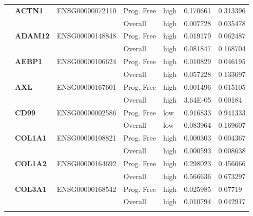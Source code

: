\begin{spacing}{1}
{\begin{longtable}{|>{\bfseries}p{2cm}|>{\bfseries}p{1.9cm}|p{2.8cm}|p{2cm}|p{2cm}|p{1.5cm}|p{1.5cm}|}
            \multirow{2}{3cm}{True}
             & ACTN1    & ENSG00000072110 & Prog. Free & high & 0.170661 & 0.313396 \\
            \hhline{~~~----}
             &          &                 & Overall    & high & 0.007728 & 0.035478 \\
            \hhline{~======}
             & ADAM12   & ENSG00000148848 & Prog. Free & high & 0.019179 & 0.062487 \\
            \hhline{~~~----}
             &          &                 & Overall    & high & 0.081847 & 0.168704 \\
            \hhline{~======}
             & AEBP1    & ENSG00000106624 & Prog. Free & high & 0.010829 & 0.046195 \\
            \hhline{~~~----}
             &          &                 & Overall    & high & 0.057228 & 0.133697 \\
            \hhline{~======}
             & AXL      & ENSG00000167601 & Prog. Free & high & 0.001496 & 0.015105 \\
            \hhline{~~~----}
             &          &                 & Overall    & high & 3.64E-05 & 0.00184  \\
            \hhline{~======}
             & CD99     & ENSG00000002586 & Prog. Free & low  & 0.916833 & 0.941333 \\
            \hhline{~~~----}
             &          &                 & Overall    & low  & 0.083964 & 0.169607 \\
            \hhline{~======}
             & COL1A1   & ENSG00000108821 & Prog. Free & high & 0.000303 & 0.004367 \\
            \hhline{~~~----}
             &          &                 & Overall    & high & 0.000593 & 0.008638 \\
            \hhline{~======}
             & COL1A2   & ENSG00000164692 & Prog. Free & high & 0.298023 & 0.456066 \\
            \hhline{~~~----}
             &          &                 & Overall    & high & 0.566636 & 0.673297 \\
            \hhline{~======}
             & COL3A1   & ENSG00000168542 & Prog. Free & high & 0.025985 & 0.07719  \\
            \hhline{~~~----}
             &          &                 & Overall    & high & 0.010794 & 0.042917 \\
            \hhline{~======}

\end{longtable}}
\end{spacing}
